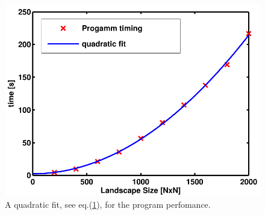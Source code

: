 \begin{figure}
 \includegraphics{Figures/TimingFitO5.pdf}
\caption{A quadratic fit, see eq.(\ref{fig:fitting curve}), for the program perfomance.}
\label{fig:fitting curve}
\end{figure}




 



